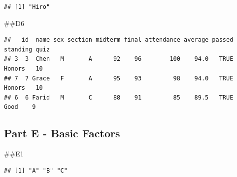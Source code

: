 \documentclass[
]{article}
\newenvironment{Shaded}{\begin{snugshade}}{\end{snugshade}}
\newcommand{\DecValTok}[1]{\textcolor[rgb]{0.00,0.00,0.81}{#1}}
\newcommand{\FunctionTok}[1]{\textcolor[rgb]{0.13,0.29,0.53}{\textbf{#1}}}
\newcommand{\NormalTok}[1]{#1}
\newcommand{\OtherTok}[1]{\textcolor[rgb]{0.56,0.35,0.01}{#1}}
\newcommand{\SpecialCharTok}[1]{\textcolor[rgb]{0.81,0.36,0.00}{\textbf{#1}}}
\begin{document}
\begin{verbatim}
## [1] "Hiro"
\end{verbatim}

\#\#D6

\begin{Shaded}
\end{Shaded}

\begin{verbatim}
##   id  name sex section midterm final attendance average passed standing quiz
## 3  3  Chen   M       A      92    96        100    94.0   TRUE   Honors   10
## 7  7 Grace   F       A      95    93         98    94.0   TRUE   Honors   10
## 6  6 Farid   M       C      88    91         85    89.5   TRUE     Good    9
\end{verbatim}

\subsection{Part E - Basic Factors}\label{part-e---basic-factors}

\#\#E1

\begin{Shaded}
\end{Shaded}

\begin{verbatim}
## [1] "A" "B" "C"
\end{verbatim}

\begin{Shaded}
\end{Shaded}
\end{document}

